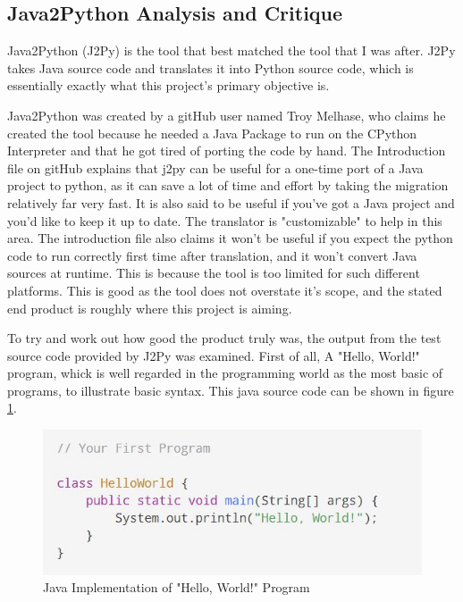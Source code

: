 \documentclass{l4proj}
\begin{document}
\subsection{Java2Python Analysis and Critique}
Java2Python (J2Py) is the tool that best matched the tool that I was after. J2Py takes Java source code and translates it into Python source code, which is essentially exactly what this project's primary objective is. 

Java2Python was created by a gitHub user named Troy Melhase, who claims he created the tool because he needed a Java Package to run on the CPython Interpreter and that he got tired of porting the code by hand. The Introduction file on gitHub explains that j2py can be useful for a one-time port of a Java project to python, as it can save a lot of time and effort by taking the migration relatively far very fast. It is also said to be useful if you've got a Java project and you'd like to keep it up to date. The translator is "customizable" to help in this area. The introduction file also claims it won't be useful if you expect the python code to run correctly first time after translation, and it won't convert Java sources at runtime. This is because the tool is too limited for such different platforms. This is good as the tool does not overstate it's scope, and the stated end product is roughly where this project is aiming. 

To try and work out how good the product truly was, the output from the test source code provided by J2Py was examined. First of all, A "Hello, World!" program, whick is well regarded in the programming world as the most basic of programs, to illustrate basic syntax. This java source code can be shown in figure \ref{fig:helloWorldJava}.

\begin{figure}[htb]
    \centering
    \includegraphics[width=1\linewidth]{images/helloWorldJava.JPG}
        \caption{Java Implementation of "Hello, World!" Program
    }
    \label{fig:helloWorldJava} 
\end{figure}
\end{document}
